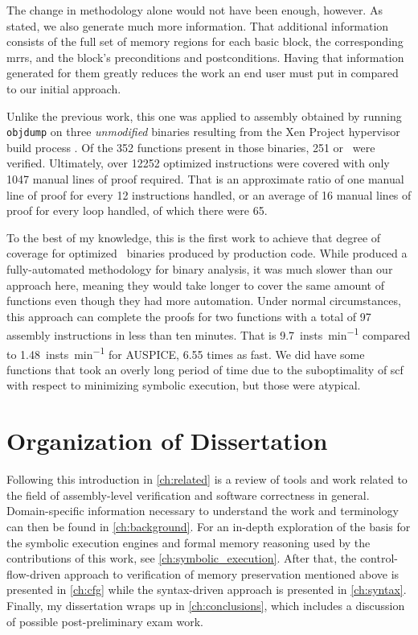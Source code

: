 The change in methodology alone would not have been enough, however.
As stated, we also generate much more information.
That additional information consists of the full set of memory regions
for each basic block, the corresponding \acp{mrr},
and the block's preconditions and postconditions.
Having that information generated for them greatly reduces the work an end user
must put in compared to our initial approach.

Unlike the previous work, this one was applied to assembly obtained
by running \texttt{objdump} on three \emph{unmodified} binaries resulting from the
Xen Project hypervisor build process \autocite{chisnall2008definitive}.
Of the \num{352} functions present in those binaries,
\num{251} or \xenpercentage\ were verified.
Ultimately, over \num{12252} optimized instructions were covered
with only \num{1047} manual lines of proof required.
That is an approximate ratio of one manual line of proof
for every \num{12} instructions handled,
or an average of \num{16} manual lines of proof for every loop handled,
of which there were \num{65}.

To the best of my knowledge, this is the first work to achieve
that degree of coverage for optimized \arch\ binaries produced by production code.
While \textcite{tan2015auspice} produced a fully-automated methodology
for binary analysis, it was much slower than our approach here,
meaning they would take longer to cover the same amount of functions
even though they had more automation.
Under normal circumstances, this approach can complete the proofs for two functions
with a total of \num{97} assembly instructions in less than ten minutes.
That is \SI{9.7}{insts\per\minute} compared to \SI{1.48}{insts\per\minute}
for AUSPICE, \num{6.55} times as fast. We did have some functions that took
an overly long period of time due to the suboptimality of \acl*{scf}
with respect to minimizing symbolic execution, but those were atypical.

\section{Organization of Dissertation}
Following this introduction in \cref{ch:related} is a review of tools and work
related to the field of assembly-level verification and software correctness in general.
Domain-specific information necessary to understand the work
and terminology can then be found in \cref{ch:background}.
For an in-depth exploration of the basis for the symbolic execution engines
and formal memory reasoning used by the contributions of this work,
see \cref{ch:symbolic_execution}.
After that, the control-flow-driven approach to verification of memory preservation
mentioned above is presented in \cref{ch:cfg}
while the syntax-driven approach is presented in \cref{ch:syntax}.
Finally, my dissertation wraps up in \cref{ch:conclusions},
which includes a discussion of possible post-preliminary exam work.
